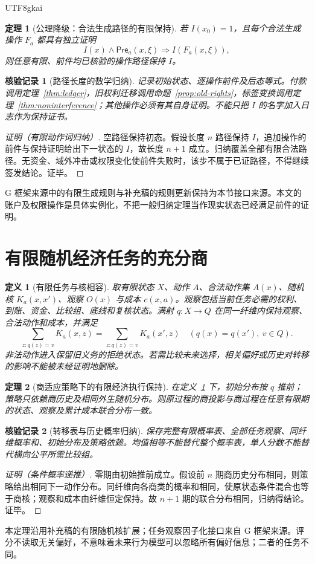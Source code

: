 \documentclass[12pt,a4paper,openany]{report}
\newtheorem{definition}{定义}[chapter]
\newtheorem{theorem}{定理}[chapter]
\newtheorem{Certificate}{核验记录}[chapter]
\begin{document}
\begin{CJK*}{UTF8}{gkai}
\begin{theorem}[公理降级：合法生成路径的有限保持]
\label{thm:invariant}
若 $I(x_0)=1$，且每个合法生成操作 $F_a$ 都具有独立证明
\[
 I(x)\land\mathsf{Pre}_a(x,\xi)
 \Longrightarrow I(F_a(x,\xi)),
\]
则任意有限、前件均已核验的操作路径保持 $I$。
\end{theorem}
\begin{Certificate}[路径长度的数学归纳]
记录初始状态、逐操作前件及后态等式。付款调用定理~\ref{thm:ledger}，旧权利迁移调用命题~\ref{prop:old-rights}，标签变换调用定理~\ref{thm:noninterference}；其他操作必须有其自身证明。不能只把 $I$ 的名字加入日志作为保持证书。
\end{Certificate}
\begin{proof}[证明（有限动作词归纳）]
空路径保持初态。假设长度 $n$ 路径保持 $I$，追加操作的前件与保持证明给出下一状态的 $I$，故长度 $n+1$ 成立。归纳覆盖全部有限合法路径。无资金、域外冲击或权限变化使前件失败时，该步不属于已证路径，不得继续签发结论。证毕。
\end{proof}
G 框架来源中的有限生成规则与补充稿的规则更新保持为本节接口来源\cite{SourceG,SourceSupplement}。本文的账户及权限操作是具体实例化，不把一般归纳定理当作现实状态已经满足前件的证明。

\section{有限随机经济任务的充分商}
\begin{definition}[有限任务与核相容]
\label{def:quotient}
取有限状态 $X$、动作 $A$、合法动作集 $A(x)$、随机核 $K_a(x,x')$、观察 $O(x)$ 与成本 $c(x,a)$。观察包括当前任务必需的权利、到账、资金、比较组、底线和复核状态。满射 $q:X\to Q$ 在同一纤维内保持观察、合法动作和成本，并满足
\[
 \sum_{z:q(z)=v}K_a(x,z)
 =\sum_{z:q(z)=v}K_a(x',z)
 \quad(q(x)=q(x'),\ v\in Q).
\]
非法动作进入保留旧义务的拒绝状态。若需比较未来选择，相关偏好或历史对转移的影响不能被未经证明地删除。
\end{definition}

\begin{theorem}[商适应策略下的有限经济执行保持]
\label{thm:quotient}
在定义~\ref{def:quotient} 下，初始分布按 $q$ 推前；策略只依赖商历史及相同外生随机分布。则原过程的商投影与商过程在任意有限期的状态、观察及累计成本联合分布一致。
\end{theorem}
\begin{Certificate}[转移表与历史概率归纳]
保存完整有限概率表、全部任务观察、同纤维概率和、初始分布及策略依赖。均值相等不能替代整个概率表，单人分数不能替代横向公平所需比较组。
\end{Certificate}
\begin{proof}[证明（条件概率递推）]
零期由初始推前成立。假设前 $n$ 期商历史分布相同，则策略给出相同下一动作分布。同纤维向各商类的概率和相同，使原状态条件混合也等于商核；观察和成本由纤维恒定保持。故 $n+1$ 期的联合分布相同，归纳得结论。证毕。
\end{proof}
本定理沿用补充稿的有限随机核扩展\cite{SourceSupplement}；任务观察因子化接口来自 G 框架来源\cite{SourceG}。评分不读取无关偏好，不意味着未来行为模型可以忽略所有偏好信息；二者的任务不同。


\end{CJK*}
\end{document}
